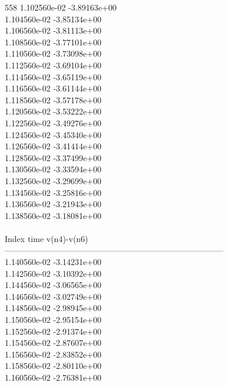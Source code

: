 558	1.102560e-02	-3.89163e+00	\\ 	1.104560e-02	-3.85134e+00	\\ 	1.106560e-02	-3.81113e+00	\\ 	1.108560e-02	-3.77101e+00	\\ 	1.110560e-02	-3.73098e+00	\\ 	1.112560e-02	-3.69104e+00	\\ 	1.114560e-02	-3.65119e+00	\\ 	1.116560e-02	-3.61144e+00	\\ 	1.118560e-02	-3.57178e+00	\\ 	1.120560e-02	-3.53222e+00	\\ 	1.122560e-02	-3.49276e+00	\\ 	1.124560e-02	-3.45340e+00	\\ 	1.126560e-02	-3.41414e+00	\\ 	1.128560e-02	-3.37499e+00	\\ 	1.130560e-02	-3.33594e+00	\\ 	1.132560e-02	-3.29699e+00	\\ 	1.134560e-02	-3.25816e+00	\\ 	1.136560e-02	-3.21943e+00	\\ 	1.138560e-02	-3.18081e+00	\\ \hline
\\ \hline
Index   time            v(n4)-v(n6)     \\ \hline
--------------------------------------------------------------------------------\\ 	1.140560e-02	-3.14231e+00	\\ 	1.142560e-02	-3.10392e+00	\\ 	1.144560e-02	-3.06565e+00	\\ 	1.146560e-02	-3.02749e+00	\\ 	1.148560e-02	-2.98945e+00	\\ 	1.150560e-02	-2.95154e+00	\\ 	1.152560e-02	-2.91374e+00	\\ 	1.154560e-02	-2.87607e+00	\\ 	1.156560e-02	-2.83852e+00	\\ 	1.158560e-02	-2.80110e+00	\\ 	1.160560e-02	-2.76381e+00	\\ \hline
